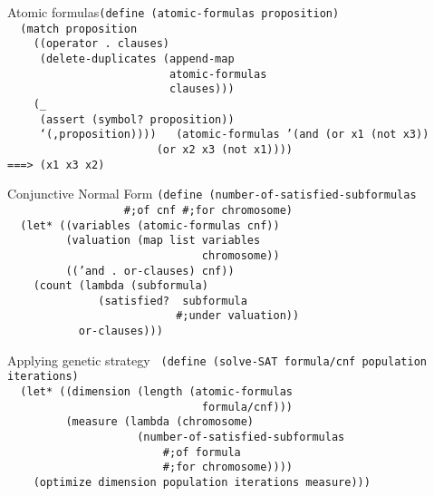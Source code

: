 \documentclass{beamer}
\begin{document}
\begin{frame}{Atomic formulas}\texttt{(define (atomic-formulas proposition)
    \\ \pause
\ \ (match proposition\\ \pause
\ \ \ \ ((operator . clauses)\\ \pause
\ \ \ \ \ (delete-duplicates (append-map \\
\ \ \ \ \ \ \ \ \ \ \ \ \ \ \ \ \ \ \ \ \ \ \ \ \ atomic-formulas \\
\ \ \ \ \ \ \ \ \ \ \ \ \ \ \ \ \ \ \ \ \ \ \ \ \ clauses)))\\ \pause
\ \ \ \ (\_ \\ \pause
\ \ \ \ \ (assert (symbol? proposition)) \\
\ \ \ \ \ `(,proposition)))) \\ \pause
\ \\
(atomic-formulas '(and (or x1 (not x3))\\
\ \ \ \ \ \ \ \ \ \ \ \ \ \ \ \ \ \ \ \ \ \ \ (or x2 x3 (not x1)))) \\ \pause
===> (x1 x3 x2)
  }
\end{frame}

\begin{frame}{Conjunctive Normal Form}
  \texttt{(define (number-of-satisfied-subformulas \\ 
    \ \ \ \ \ \ \ \ \ \ \ \ \ \ \ \ \ \ \#;of cnf \#;for chromosome) \\ \pause
\ \ (let* ((variables (atomic-formulas cnf)) \\ \pause
\ \ \ \ \ \ \ \ \ (valuation (map list variables \\
\ \ \ \ \ \ \ \ \ \ \ \ \ \ \ \ \ \ \ \ \ \ \ \ \ \ \ \ \ \ chromosome)) \\ \pause
\ \ \ \ \ \ \ \ \ (('and . or-clauses) cnf)) \\ \pause
\ \ \ \ (count (lambda (subformula) \\
\ \ \ \ \ \ \ \ \ \ \ \ \ \ (satisfied?\,\,subformula \\
\ \ \ \ \ \ \ \ \ \ \ \ \ \ \ \ \ \ \ \ \ \ \ \ \ \ \#;under valuation)) \\
\ \ \ \ \ \ \ \ \ \ \ or-clauses)))}
\end{frame}

\begin{frame}{Applying genetic strategy}
  \texttt{\footnotesize
    (define (solve-SAT formula/cnf population iterations) \\ \pause
\ \ (let* ((dimension (length (atomic-formulas \\
\ \ \ \ \ \ \ \ \ \ \ \ \ \ \ \ \ \ \ \ \ \ \ \ \ \ \ \ \ \ formula/cnf)))\\ \pause
\ \ \ \ \ \ \ \ \ (measure (lambda (chromosome) \\
\ \ \ \ \ \ \ \ \ \ \ \ \ \ \ \ \ \ \ \ (number-of-satisfied-subformulas \\
\ \ \ \ \ \ \ \ \ \ \ \ \ \ \ \ \ \ \ \ \ \ \ \ \#;of formula \\
\ \ \ \ \ \ \ \ \ \ \ \ \ \ \ \ \ \ \ \ \ \ \ \ \#;for chromosome)))) \\ \pause
\ \ \ \ (optimize dimension population iterations measure)))}
\end{frame}
\end{document}
